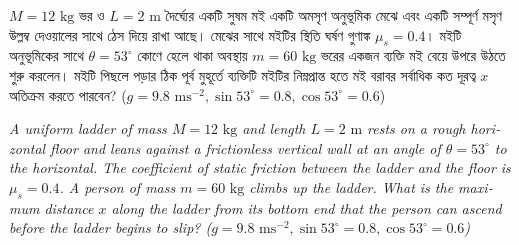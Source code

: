 \documentclass[12pt, a4paper]{article}
\begin{document}
\begin{tcolorbox}[questionbox={প্রশ্ন (Question) 46}]
    \noindent
    $M = 12\text{ kg}$ ভর ও $L = 2\text{ m}$ দৈর্ঘ্যের একটি সুষম মই একটি অমসৃণ অনুভূমিক মেঝে এবং একটি সম্পূর্ণ মসৃণ উল্লম্ব দেওয়ালের সাথে ঠেস দিয়ে রাখা আছে। মেঝের সাথে মইটির স্থিতি ঘর্ষণ গুণাঙ্ক $\mu_s = 0.4$। মইটি অনুভূমিকের সাথে $\theta = 53^\circ$ কোণে হেলে থাকা অবস্থায় $m = 60\text{ kg}$ ভরের একজন ব্যক্তি মই বেয়ে উপরে উঠতে শুরু করলেন। মইটি পিছলে পড়ার ঠিক পূর্ব মুহূর্তে ব্যক্তিটি মইটির নিম্নপ্রান্ত হতে মই বরাবর সর্বাধিক কত দূরত্ব $x$ অতিক্রম করতে পারবেন? ($g = 9.8\text{ ms}^{-2}, \sin 53^\circ = 0.8, \cos 53^\circ = 0.6$)
    
    \vspace{0.8em}
    \begin{english}
    \noindent\textit{\color{darkgray}
    A uniform ladder of mass $M = 12\text{ kg}$ and length $L = 2\text{ m}$ rests on a rough horizontal floor and leans against a frictionless vertical wall at an angle of $\theta = 53^\circ$ to the horizontal. The coefficient of static friction between the ladder and the floor is $\mu_s = 0.4$. A person of mass $m = 60\text{ kg}$ climbs up the ladder. What is the maximum distance $x$ along the ladder from its bottom end that the person can ascend before the ladder begins to slip? ($g = 9.8\text{ ms}^{-2}, \sin 53^\circ = 0.8, \cos 53^\circ = 0.6$)
    }
    \end{english}
\end{tcolorbox}

\vspace{1em}
\begin{center}
\end{center}
\vspace{1em}
\end{document}
